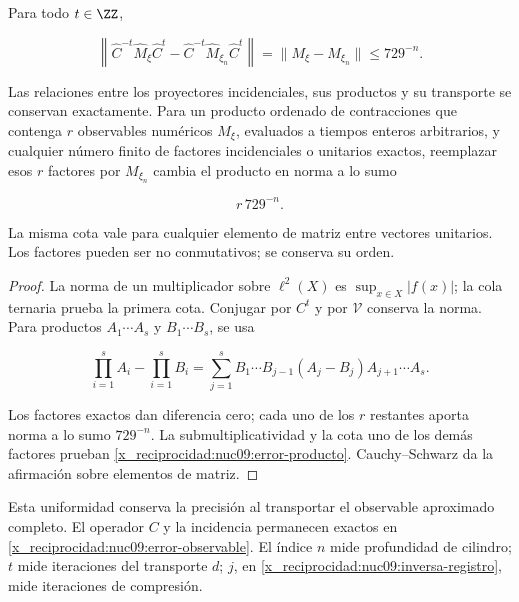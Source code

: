 \begin{theorem}
\label{x_reciprocidad:nuc09:precision}
Para todo \(t\in\ZZ\),



\begin{equation}
\boxed{
\left\|\widehat C^{-t}\widehat M_\xi\widehat C^t
-\widehat C^{-t}\widehat M_{\xi_n}\widehat C^t\right\|
=\|M_\xi-M_{\xi_n}\|\le729^{-n}.}
\label{x_reciprocidad:nuc09:error-observable}
\end{equation}



Las relaciones entre los proyectores incidenciales, sus productos
y su transporte se conservan exactamente.
Para un producto ordenado de contracciones que contenga \(r\)
observables numéricos \(M_\xi\), evaluados a tiempos enteros
arbitrarios, y cualquier número finito de factores incidenciales
o unitarios exactos, reemplazar esos \(r\) factores por
\(M_{\xi_n}\) cambia el producto en norma a lo sumo



\begin{equation}
\boxed{r\,729^{-n}.}
\label{x_reciprocidad:nuc09:error-producto}
\end{equation}



La misma cota vale para cualquier elemento de matriz entre vectores
unitarios. Los factores pueden ser no conmutativos; se conserva su orden.
\end{theorem}

\begin{proof}
La norma de un multiplicador sobre \(\ell^2(X)\) es
\(\sup_{x\in X}|f(x)|\); la cola ternaria prueba la primera cota.
Conjugar por \(C^t\) y por \(\mathcal V\) conserva la norma.
Para productos \(A_1\cdots A_s\) y \(B_1\cdots B_s\), se usa



\[
\prod_{i=1}^s A_i-\prod_{i=1}^s B_i
=\sum_{j=1}^s B_1\cdots B_{j-1}(A_j-B_j)A_{j+1}\cdots A_s.
\]



Los factores exactos dan diferencia cero; cada uno de los \(r\)
restantes aporta norma a lo sumo \(729^{-n}\).
La submultiplicatividad y la cota uno de los demás factores prueban
\eqref{x_reciprocidad:nuc09:error-producto}.
Cauchy--Schwarz da la afirmación sobre elementos de matriz.
\end{proof}

Esta uniformidad conserva la precisión al transportar el observable
aproximado completo. El operador \(C\) y la incidencia permanecen
exactos en \eqref{x_reciprocidad:nuc09:error-observable}.
El índice \(n\) mide profundidad de cilindro; \(t\) mide iteraciones
del transporte \(d\); \(j\), en \eqref{x_reciprocidad:nuc09:inversa-registro},
mide iteraciones de compresión.

